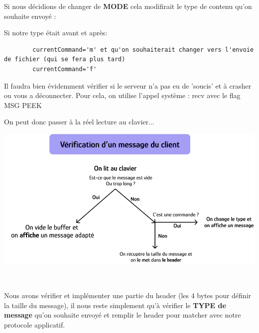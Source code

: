     Si nous décidions de changer de \textbf{MODE} cela modifirait le type de contenu qu'on souhaite envoyé : \par
    \tab[2cm]Si notre type était avant et après:
    \begin{lstlisting}
        currentCommand='m' et qu'on souhaiterait changer vers l'envoie de fichier (qui se fera plus tard)
        currentCommand='f'
    \end{lstlisting}

    Il faudra bien évidemment vérifier si le serveur n'a pas eu de 'soucis' et à crasher ou vous a déconnecter. Pour cela, on utilise l'appel système : recv avec le flag MSG PEEK \\ \par

    On peut donc passer à la réel lecture au clavier...

    {
    \centering
    \includegraphics[width=14cm]{figures/verif_msg_client_send.png}
    \par
    } \hfill \\ \par

    Nous avons vérifier et implémenter une partie du header (les 4 bytes pour définir la taille du message), il nous reste simplement qu'à vérifier le \textbf{TYPE de message} qu'on souhaite envoyé et remplir le header pour matcher avec notre protocole applicatif. \\ \par

